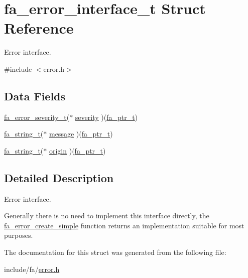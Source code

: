 \hypertarget{structfa__error__interface__t}{\section{fa\-\_\-error\-\_\-interface\-\_\-t Struct Reference}
\label{structfa__error__interface__t}
}


Error interface.  




{\ttfamily \#include $<$error.\-h$>$}

\subsection*{Data Fields}
\begin{DoxyCompactItemize}
\item 
\hyperlink{group___fa_error_ga5cf5c13f1e12ae6b125c0265f59f4d82}{fa\-\_\-error\-\_\-severity\-\_\-t}($\ast$ \hyperlink{group___fa_ga807584be7eb293e0652244402d75dbcd}{severity} )(\hyperlink{group___fa_ga915ddeae99ad7568b273d2b876425197}{fa\-\_\-ptr\-\_\-t})
\item 
\hyperlink{group___fa_string_gacada63033b77bc6c39fa632ae199349b}{fa\-\_\-string\-\_\-t}($\ast$ \hyperlink{group___fa_gab6391b11a29223edb8b7d54f40afe87d}{message} )(\hyperlink{group___fa_ga915ddeae99ad7568b273d2b876425197}{fa\-\_\-ptr\-\_\-t})
\item 
\hyperlink{group___fa_string_gacada63033b77bc6c39fa632ae199349b}{fa\-\_\-string\-\_\-t}($\ast$ \hyperlink{group___fa_ga525154e1609ceea50d645c3d102a01e6}{origin} )(\hyperlink{group___fa_ga915ddeae99ad7568b273d2b876425197}{fa\-\_\-ptr\-\_\-t})
\end{DoxyCompactItemize}


\subsection{Detailed Description}
Error interface. 

Generally there is no need to implement this interface directly, the \hyperlink{group___fa_error_gadd811b06a5cd740039902f77efd4e661}{fa\-\_\-error\-\_\-create\-\_\-simple} function returns an implementation suitable for most purposes. 

The documentation for this struct was generated from the following file\-:\begin{DoxyCompactItemize}
\item 
include/fa/\hyperlink{error_8h}{error.\-h}\end{DoxyCompactItemize}
